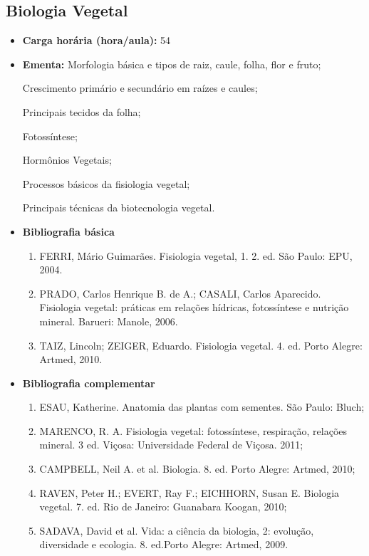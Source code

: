 \documentclass[11pt,fleqn]{book} %
\begin{document}
\subsection{Biologia Vegetal}\label{disc:biotecVegetal}
\begin{itemize}
	\item \textbf{Carga horária (hora/aula):} 54
	\item \textbf{Ementa:}	
	Morfologia básica e tipos de raiz, caule, folha, flor e fruto; 
	
	Crescimento primário e secundário em raízes e caules; 
	
	Principais tecidos da folha;	

	Fotossíntese; 
	
	Hormônios Vegetais; 
	
	Processos básicos da fisiologia vegetal; 
	
	Principais técnicas da biotecnologia vegetal.
	\item \textbf{Bibliografia básica}
	\begin{enumerate}
		\item FERRI, Mário Guimarães. Fisiologia vegetal, 1. 2. ed. São Paulo: EPU, 2004. 
		\item PRADO, Carlos Henrique B. de A.; CASALI, Carlos Aparecido.  Fisiologia vegetal: práticas em relações hídricas, fotossíntese e nutrição mineral. Barueri: Manole, 2006.
		\item TAIZ, Lincoln; ZEIGER, Eduardo. Fisiologia vegetal. 4. ed. Porto Alegre: Artmed, 2010.
	\end{enumerate}
	\item \textbf{Bibliografia complementar}
	\begin{enumerate}
		\item ESAU, Katherine. Anatomia das plantas com sementes. São Paulo: Bluch;
		\item MARENCO, R. A. Fisiologia vegetal: fotossíntese, respiração, relações mineral. 3 ed. Viçosa: Universidade Federal de Viçosa. 2011;
		\item CAMPBELL, Neil A. et al. Biologia. 8. ed. Porto Alegre: Artmed, 2010;
		\item RAVEN, Peter H.; EVERT, Ray F.; EICHHORN, Susan E. Biologia vegetal. 7. ed. Rio de Janeiro: Guanabara Koogan, 2010;
		\item SADAVA, David et al. Vida: a ciência da biologia, 2: evolução, diversidade e ecologia. 8. ed.Porto Alegre: Artmed, 2009.
	\end{enumerate}	
\end{itemize}
\end{document}
